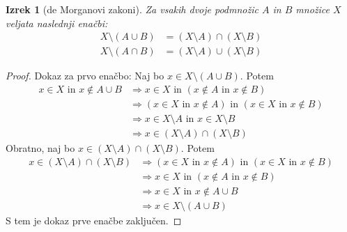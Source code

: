 \documentclass[12pt]{article}
\theoremstyle{plain}
\newtheorem{izrek}{Izrek}
\theoremstyle{definition}
\theoremstyle{remark}
\begin{document}
\begin{izrek}[de Morganovi zakoni]
  Za vsakih dvoje podmnožic $A$ in $B$ množice $X$ veljata naslednji enačbi:
  \begin{align}
    X\setminus (A \cup B) & = (X \setminus A) \cap (X \setminus B) \label{eq:deMorgan1}\\
    X\setminus (A \cap B) & = (X \setminus A) \cup (X \setminus B) \label{eq:deMorgan2}
  \end{align}
\end{izrek}
\begin{proof}
  Dokaz za prvo enačbo:
  Naj bo $x \in X\setminus (A \cup B)$. Potem 
  \begin{align*}
    x \in X \text{ in } x \notin A \cup B
    & \Rightarrow x \in X \text{ in } (x \notin A \text{ in } x \notin B) \\
    & \Rightarrow  (x \in X \text{ in } x \notin A) \text{ in } (x \in X \text{ in } x \notin B) \\
    & \Rightarrow x \in X \setminus A \text{ in } x \in X \setminus B \\
    & \Rightarrow  x \in (X \setminus A) \cap (X \setminus B)
  \end{align*}
%
  Obratno, naj bo $x \in (X \setminus A) \cap (X \setminus B)$. Potem 
  \begin{align*}
    x \in (X \setminus A) \cap (X \setminus B)
    & \Rightarrow (x \in X \text{ in } x \notin A) \text{ in } (x \in X \text{ in } x \notin B) \\
    & \Rightarrow x \in X \text{ in } (x \notin A \text{ in } x \notin B) \\
    & \Rightarrow x \in X \text{ in } x \notin A \cup B \\
    & \Rightarrow x \in X\setminus (A \cup B)
  \end{align*}
S tem je dokaz prve enačbe zaključen.


\end{proof}
\end{document}
